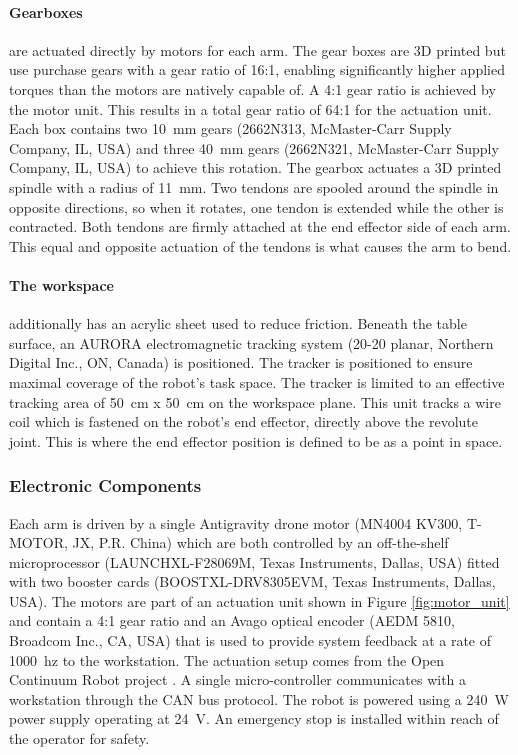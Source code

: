 \paragraph{Gearboxes} are actuated directly by motors for each arm. The gear boxes are 3D printed but use purchase gears with a gear ratio of 16:1, enabling significantly higher applied torques than the motors are natively capable of. A 4:1 gear ratio is achieved by the motor unit. This results in a total gear ratio of 64:1 for the actuation unit. Each box contains two \SI{10}{mm} gears (2662N313, McMaster-Carr Supply Company, IL, USA) and three \SI{40}{mm} gears (2662N321, McMaster-Carr Supply Company, IL, USA) to achieve this rotation. The gearbox actuates a 3D printed spindle with a radius of \SI{11}{mm}. Two tendons are spooled around the spindle in opposite directions, so when it rotates, one tendon is extended while the other is contracted. Both tendons are firmly attached at the end effector side of each arm. This equal and opposite actuation of the tendons is what causes the arm to bend. 

\paragraph{The workspace} additionally has an acrylic sheet used to reduce friction. Beneath the table surface, an AURORA electromagnetic tracking system (20-20 planar, Northern Digital Inc., ON, Canada) is positioned. The tracker is positioned to ensure maximal coverage of the robot's task space. The tracker is limited to an effective tracking area of \SI{50}{cm} x \SI{50}{cm} on the workspace plane. This unit tracks a wire coil which is fastened on the robot's end effector, directly above the revolute joint. This is where the end effector position is defined to be as a point in space. 

\subsubsection{Electronic Components}
Each arm is driven by a single Antigravity drone motor (MN4004 KV300, T-MOTOR, JX, P.R. China) which are both controlled by an off-the-shelf microprocessor (LAUNCHXL-F28069M, Texas Instruments, Dallas, USA) fitted with two booster cards (BOOSTXL-DRV8305EVM, Texas Instruments, Dallas, USA). The motors are part of an actuation unit shown in Figure \ref{fig:motor_unit} and contain a 4:1 gear ratio and an Avago optical encoder (AEDM 5810, Broadcom Inc., CA, USA) that is used to provide system feedback at a rate of \SI{1000}{hz} to the workstation. The actuation setup comes from the Open Continuum Robot project \cite{open_cr, Grimminger_2020}. A single micro-controller communicates with a workstation through the CAN bus protocol. The robot is powered using a \SI{240}{W} power supply operating at \SI{24}{V}. An emergency stop is installed within reach of the operator for safety. 

